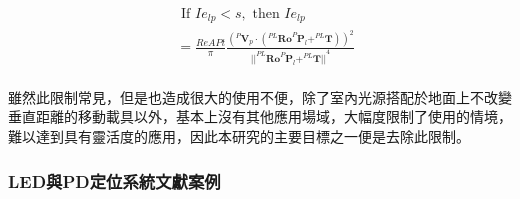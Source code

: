 \begin{description}
        \begin{equation}
            \label{eqn:model_parallel_restrict}
            \begin{aligned}
                &\text { If } Ie_{lp}<s ,\text{ then }Ie_{lp} \\
                    &= \frac{ReAPt}{ \pi}
                \frac{
                        {( ^{P}\boldsymbol{V}_p \cdot 
                            (
                                ^{PL} \boldsymbol{Ro}^{P}\boldsymbol{P}_l
                                + ^{PL}\boldsymbol{T}
                            )
                        )}^2
                    } 
                    {
                        {
                            ||
                                ^{PL}\boldsymbol{Ro}^{P}\boldsymbol{P}_l+^{PL}\boldsymbol{T}
                            ||
                        }^{4}
                    }\\
            \end{aligned}
        \end{equation}

        \qquad
        雖然此限制常見，但是也造成很大的使用不便，除了室內光源搭配於地面上不改變垂直距離的移動載具以外，基本上沒有其他應用場域，大幅度限制了使用的情境，難以達到具有靈活度的應用，因此本研究的主要目標之一便是去除此限制。
    

    \end{description}
    






    \subsubsection{LED與PD定位系統文獻案例}
    \label{chp:LEDPD_case}

    

